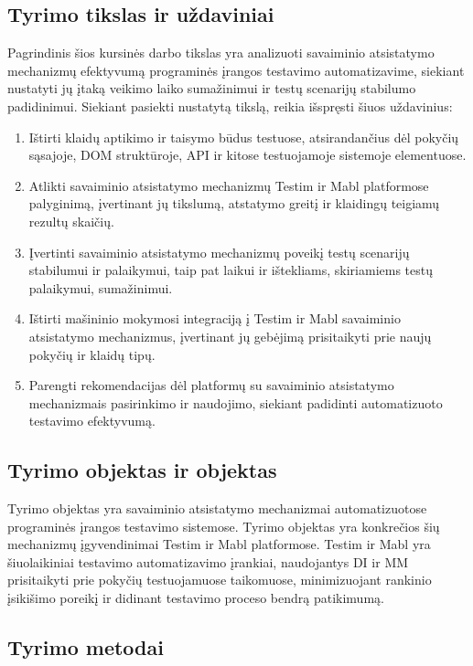 \documentclass[
]{VUMIFPSkursinis}
\begin{document}
\subsection{Tyrimo tikslas ir uždaviniai}

Pagrindinis šios kursinės darbo tikslas yra analizuoti savaiminio atsistatymo mechanizmų efektyvumą programinės įrangos testavimo automatizavime, siekiant nustatyti jų įtaką veikimo laiko sumažinimui ir testų scenarijų stabilumo padidinimui. Siekiant pasiekti nustatytą tikslą, reikia išspręsti šiuos uždavinius:

\begin{enumerate}
    \item Ištirti klaidų aptikimo ir taisymo būdus testuose, atsirandančius dėl pokyčių sąsajoje, DOM struktūroje, API ir kitose testuojamoje sistemoje elementuose.
    \item Atlikti savaiminio atsistatymo mechanizmų Testim ir Mabl platformose palyginimą, įvertinant jų tikslumą, atstatymo greitį ir klaidingų teigiamų rezultų skaičių.
    \item Įvertinti savaiminio atsistatymo mechanizmų poveikį testų scenarijų stabilumui ir palaikymui, taip pat laikui ir ištekliams, skiriamiems testų palaikymui, sumažinimui.
    \item Ištirti mašininio mokymosi integraciją į Testim ir Mabl savaiminio atsistatymo mechanizmus, įvertinant jų gebėjimą prisitaikyti prie naujų pokyčių ir klaidų tipų.
    \item Parengti rekomendacijas dėl platformų su savaiminio atsistatymo mechanizmais pasirinkimo ir naudojimo, siekiant padidinti automatizuoto testavimo efektyvumą.
\end{enumerate}

\subsection{Tyrimo objektas ir objektas}

Tyrimo objektas yra savaiminio atsistatymo mechanizmai automatizuotose programinės įrangos testavimo sistemose. Tyrimo objektas yra konkrečios šių mechanizmų įgyvendinimai Testim ir Mabl platformose. Testim ir Mabl yra šiuolaikiniai testavimo automatizavimo įrankiai, naudojantys DI ir MM prisitaikyti prie pokyčių testuojamuose taikomuose, minimizuojant rankinio įsikišimo poreikį ir didinant testavimo proceso bendrą patikimumą.

\subsection{Tyrimo metodai}
\end{document}
